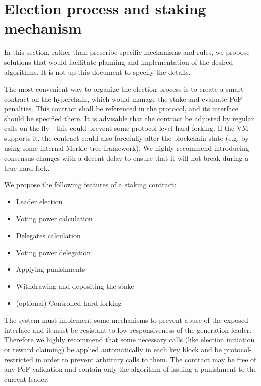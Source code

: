 \section{Election process and staking mechanism}

In this section, rather than prescribe specific mechanisms and rules, we propose
solutions that would facilitate planning and implementation of the desired
algorithms. It is not up this document to specify the details.

The most convenient way to organize the election process is to create a smart
contract on the hyperchain, which would manage the stake and evaluate PoF
penalties. This contract shall be referenced in the protocol, and its interface
should be specified there. It is advisable that the contract be adjusted by
regular calls on the fly---this could prevent some protocol-level hard forking.
If the VM supports it, the contract could also forcefully alter the blockchain
state (e.g. by using some internal Merkle tree framework). We highly recommend
introducing consensus changes with a decent delay to ensure that it will not
break during a true hard fork.

We propose the following features of a staking contract:

\begin{itemize}
\item Leader election
\item Voting power calculation
\item Delegates calculation
\item Voting power delegation
\item Applying punishments
\item Withdrawing and depositing the stake
\item (optional) Controlled hard forking
\end{itemize}

The system must implement some mechanisms to prevent abuse of the exposed
interface and it must be resistant to low responsiveness of the generation
leader. Therefore we highly recommend that some necessary calls (like election
initiation or reward claiming) be applied automatically in each key block and be
protocol-restricted in order to prevent arbitrary calls to them. The contract
may be free of any PoF validation and contain only the algorithm of issuing a
punishment to the current leader.

